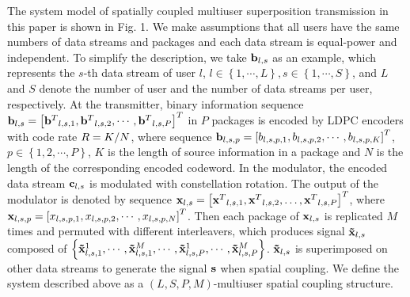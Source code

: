\documentclass[conference]{IEEEtran}
\begin{document}
The system model of spatially coupled multiuser superposition transmission in this paper is shown in Fig. 1. We make assumptions that all users have the same numbers of data streams and packages and each data stream is equal-power and independent. To simplify the description, we take ${{\bf{b}}_{l,s}}$ as an example, which represents the $s$-th data stream of user $l$, $l \in \left\{ {1, \cdots ,L} \right\},s \in \left\{ {1, \cdots ,S} \right\}$, and $L$ and $S$ denote the number of user and the number of data streams per user, respectively. At the transmitter, binary information sequence ${{\bf{b}}_{l,s}} = {\left[ {{{\bf{b}}^T}_{l,s,1},{{\bf{b}}^T}_{l,s,2}, \cdots ,{{\bf{b}}^T}_{l,s,P}} \right]^T}$ in $P$ packages is encoded by LDPC encoders with code rate $R = {K \mathord{\left/
 {\vphantom {K N}} \right.
 \kern-\nulldelimiterspace} N}$, where sequence ${{\bf{b}}_{l,s,p}} = {\left[ {{b_{l,s,p,1}},{b_{l,s,p,2}}, \cdots ,{b_{l,s,p,K}}} \right]^T}$, $p \in \left\{ {1,2, \cdots ,P} \right\}$, $K$ is the length of source information in a package and $N$ is the length of the corresponding encoded codeword. In the modulator, the encoded data stream ${{\bf{c}}_{l,s}}$ is modulated with constellation rotation. The output of the modulator is denoted by sequence ${{\bf{x}}_{l,s}} = {\left[ {{{\bf{x}}^T}_{l,s,1},{{\bf{x}}^T}_{l,s,2}, \ldots ,{{\bf{x}}^T}_{l,s,P}} \right]^T}$, where ${{\bf{x}}_{l,s,p}} = {\left[ {{x_{l,s,p,1}},{x_{l,s,p,2}}, \cdots ,{x_{l,s,p,N}}} \right]^T}$. Then each package of ${{\bf{x}}_{l,s}}$ is replicated $M$ times and permuted with different interleavers, which produces signal ${{\bf{\tilde x}}_{l,s}}$ composed of $\left\{ {{\bf{\tilde x}}_{l,s,1}^1, \cdots ,{\bf{\tilde x}}_{l,s,1}^M, \cdots ,{\bf{\tilde x}}_{l,s,P}^1, \cdots ,{\bf{\tilde x}}_{l,s,P}^M} \right\}$. ${{\bf{\tilde x}}_{l,s}}$ is superimposed on other data streams to generate the signal ${\bf{s}}$ when spatial coupling. We define the system described above as a $\left( {L,S,P,M} \right)$-multiuser spatial coupling structure.
\end{document}
